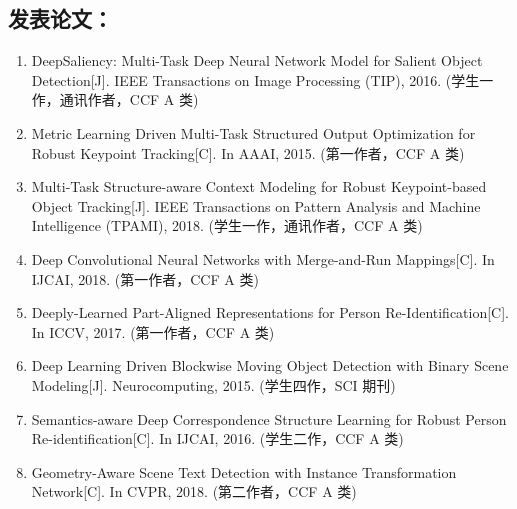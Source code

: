 \begin{publications}
\section*{发表论文：}
\begin{enumerate}
\item{
DeepSaliency: Multi-Task Deep Neural Network Model for Salient Object Detection[J]. 
{IEEE} Transactions on Image Processing (TIP), 2016. 
(学生一作，通讯作者，CCF A 类) 
}
\item{
Metric Learning Driven Multi-Task Structured Output Optimization for Robust Keypoint Tracking[C]. 
In AAAI, 2015.
(第一作者，CCF A 类) 
}
\item{
Multi-Task Structure-aware Context Modeling for Robust Keypoint-based Object Tracking[J]. 
{IEEE} Transactions on Pattern Analysis and Machine Intelligence (TPAMI), 2018. 
(学生一作，通讯作者，CCF A 类) 
}
\item{
Deep Convolutional Neural Networks with Merge-and-Run Mappings[C]. In IJCAI, 2018. 
(第一作者，CCF A 类) 
}
\item{
Deeply-Learned Part-Aligned Representations for Person Re-Identification[C]. 
In ICCV, 2017.
(第一作者，CCF A 类) 
}
\item{
Deep Learning Driven Blockwise Moving Object Detection with Binary Scene Modeling[J]. Neurocomputing, 2015.
(学生四作，SCI 期刊) 
}
\item{
Semantics-aware Deep Correspondence Structure Learning for Robust Person Re-identification[C]. 
In IJCAI, 2016.
(学生二作，CCF A 类) 
}
\item{
Geometry-Aware Scene Text Detection with Instance Transformation Network[C]. 
In CVPR, 2018. 
(第二作者，CCF A 类) 
} 
\end{enumerate}


\end{publications}
